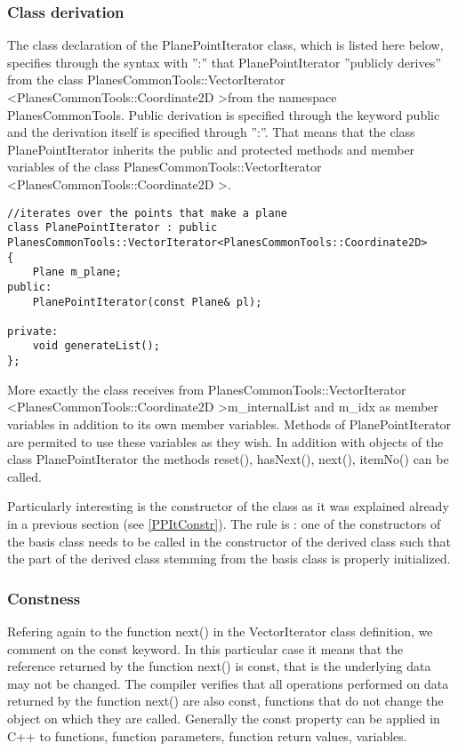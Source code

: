\subsubsection {Class derivation}

The class declaration of the PlanePointIterator class, which is listed here below, specifies through the syntax with '':'' that PlanePointIterator ''publicly derives'' from  the class PlanesCommonTools::VectorIterator \textless PlanesCommonTools::Coordinate2D \textgreater from the namespace PlanesCommonTools. Public derivation is specified through the keyword public and the derivation itself is specified through '':''. That means that the class PlanePointIterator inherits the public and protected methods and member variables of the class PlanesCommonTools::VectorIterator \textless PlanesCommonTools::Coordinate2D \textgreater.

\begin{lstlisting} 
//iterates over the points that make a plane
class PlanePointIterator : public PlanesCommonTools::VectorIterator<PlanesCommonTools::Coordinate2D>
{
    Plane m_plane;
public:
    PlanePointIterator(const Plane& pl);

private:
    void generateList();
};
\end{lstlisting}

More exactly the class receives from PlanesCommonTools::VectorIterator \textless PlanesCommonTools::Coordinate2D \textgreater m\_internalList and m\_idx as member variables in addition to its own member variables. Methods of PlanePointIterator are permited to use these variables as they wish. In addition with objects of the class PlanePointIterator the methods reset(), hasNext(), next(), itemNo() can be called.

Particularly interesting is the constructor of the class as it was explained already in a previous section (see \ref{PPItConstr}). The rule is : one of the constructors of the basis class needs to be called in the constructor of the derived class such that the part of the derived class stemming from the basis class is properly initialized.

\subsubsection {Constness} \label {Constness}

Refering again to the function next() in the VectorIterator class definition, we comment on the const keyword. In this particular case it means that the reference returned by the function next() is const, that is the underlying data may not be changed. The compiler verifies that all operations performed on data returned by the function next() are also const, functions that do not change the object on which they are called. Generally the const property can be applied in C++ to functions, function parameters, function return values, variables. 

